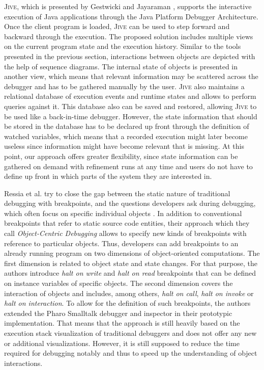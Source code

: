 \textsc{Jive}, which is presented by Gestwicki and Jayaraman \cite{gestwicki_jive:_2004, gestwicki_methodology_2005}, supports the interactive execution of Java applications through the Java Platform Debugger Architecture.
Once the client program is loaded, \textsc{Jive} can be used to step forward and backward through the execution.
The proposed solution includes multiple views on the current program state and the execution history.
Similar to the tools presented in the previous section, interactions between objects are depicted with the help of sequence diagrams.
The internal state of objects is presented in another view, which means that relevant information may be scattered across the debugger and has to be gathered manually by the user.
\textsc{Jive} also maintains a relational database of execution events and runtime states and allows to perform queries against it.
This database also can be saved and restored, allowing \textsc{Jive} to be used like a back-in-time debugger.
However, the state information that should be stored in the database has to be declared up front through the definition of watched variables, which means that a recorded execution might later become useless since information might have become relevant that is missing.
At this point, our approach offers greater flexibility, since state information can be gathered on demand with refinement runs at any time and users do not have to define up front in which parts of the system they are interested in.

Ressia et al. try to close the gap between the static nature of traditional  debugging with breakpoints, and the questions developers ask during debugging,  which often focus on specific individual objects \cite{ressia_object-centric_2012}.
In addition to conventional breakpoints that refer to static source code entities, their approach which they call \emph{Object-Centric Debugging} allows to specify new kinds of breakpoints with reference to particular objects.
Thus, developers can add breakpoints to an already running program on two dimensions of object-oriented computations.
The first dimension is related to object state and state changes.
For that purpose, the authors introduce \emph{halt on write} and \emph{halt on read} breakpoints that can be defined on instance variables of specific objects.
The second dimension covers the interaction of objects and includes, among others, \emph{halt on call}, \emph{halt on invoke} or \emph{halt on interaction}.
To allow for the definition of such breakpoints, the authors extended the Pharo Smalltalk debugger and inspector in their prototypic implementation.
That means that the approach is still heavily based on the execution stack visualization of traditional debuggers and does not offer any new or additional visualizations.
However, it is still supposed to reduce the time required for debugging notably and thus to speed up the understanding of object interactions.

